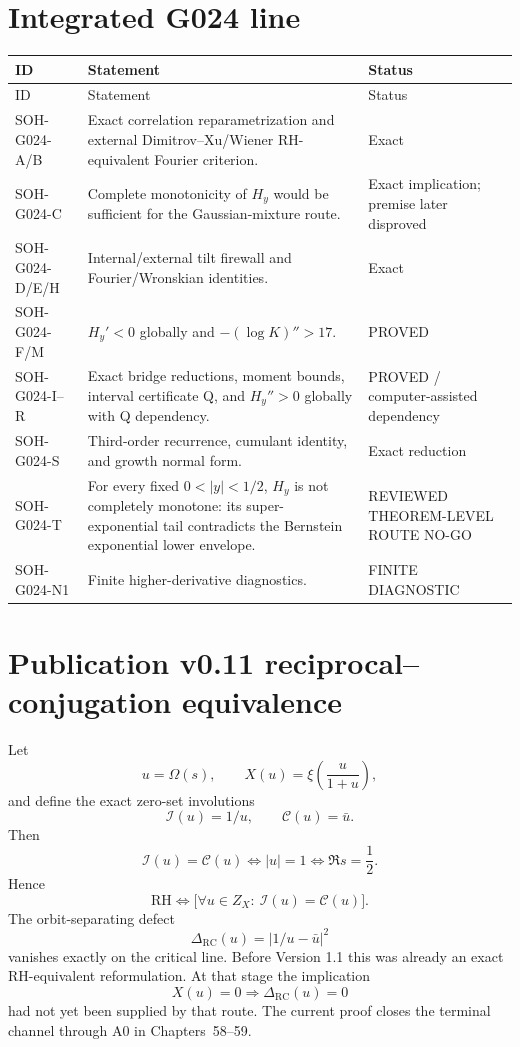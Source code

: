 \section{Integrated G024 line}
\begin{longtable}{@{}p{}p{}p{}@{}}
\toprule ID & Statement & Status\\
\midrule\endfirsthead\toprule ID & Statement & Status\\\midrule\endhead
SOH-G024-A/B & Exact correlation reparametrization and external Dimitrov--Xu/Wiener RH-equivalent Fourier criterion. & Exact\\
SOH-G024-C & Complete monotonicity of $H_y$ would be sufficient for the Gaussian-mixture route. & Exact implication; premise later disproved\\
SOH-G024-D/E/H & Internal/external tilt firewall and Fourier/Wronskian identities. & Exact\\
SOH-G024-F/M & $H_y'<0$ globally and $-(\log K)''>17$. & PROVED\\
SOH-G024-I--R & Exact bridge reductions, moment bounds, interval certificate Q, and $H_y''>0$ globally with Q dependency. & PROVED / computer-assisted dependency\\
SOH-G024-S & Third-order recurrence, cumulant identity, and growth normal form. & Exact reduction\\
SOH-G024-T & For every fixed $0<|y|<1/2$, $H_y$ is not completely monotone: its super-exponential tail contradicts the Bernstein exponential lower envelope. & REVIEWED THEOREM-LEVEL ROUTE NO-GO\\
SOH-G024-N1 & Finite higher-derivative diagnostics. & FINITE DIAGNOSTIC\\
\bottomrule
\end{longtable}

\section{Publication v0.11 reciprocal--conjugation equivalence}
Let
\[
u=\Omega(s),\qquad X(u)=\xi\!\left(\frac{u}{1+u}\right),
\]
and define the exact zero-set involutions
\[
\mathcal I(u)=1/u,\qquad \mathcal C(u)=\bar u.
\]
Then
\[
\mathcal I(u)=\mathcal C(u)
\iff |u|=1
\iff\Re s=\frac12.
\]
Hence
\[
\mathrm{RH}
\iff
\bigl[\forall u\in Z_X:\ \mathcal I(u)=\mathcal C(u)\bigr].
\]
The orbit-separating defect
\[
\Delta_{\mathrm{RC}}(u)=|1/u-\bar u|^2
\]
vanishes exactly on the critical line.  Before Version 1.1 this was already an
exact RH-equivalent reformulation.  At that stage the implication
\[
X(u)=0\Longrightarrow\Delta_{\mathrm{RC}}(u)=0
\]
had not yet been supplied by that route.  The current proof closes the
terminal channel through A0 in Chapters~58--59.

